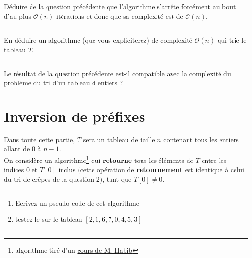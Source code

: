 \documentclass
[12pt]
{article}
\begin{document}
\subsection{}

Déduire de la question précédente que l'algorithme s'arrête forcément au bout d'au plus $\mathcal{O}(n)$ itérations et donc que sa complexité est de $\mathcal{O}(n)$.


\subsection{}

En déduire un algorithme (que vous expliciterez) de complexité $\mathcal{O}(n)$ qui trie le tableau $T$. 

\subsection{}

Le résultat de la question précédente est-il compatible avec la complexité du problème du tri d'un tableau d'entiers ?

\section{Inversion de préfixes}

Dans toute cette partie, $T$ sera un tableau de taille $n$ contenant tous les entiers allant de $0$ à $n-1$.
~\\

On considère un algorithme\footnote{algorithme tiré d'un \href{https://www.irif.fr/~habib/Documents/IntroAlgoL3.pdf}{cours de M. Habib}} qui {\bf retourne} tous les éléments de $T$ entre les indices 0 et $T[0]$ inclus (cette opération de {\bf retournement} est identique à celui du tri de crêpes de la question 2), tant que $T[0] \neq 0$.



\subsection{}

\begin{enumerate}
    \item Ecrivez un pseudo-code de cet algorithme
    \item testez le sur le tableau $[2, 1, 6, 7, 0, 4, 5, 3]$
\end{enumerate}


\subsection{}
\end{document}
